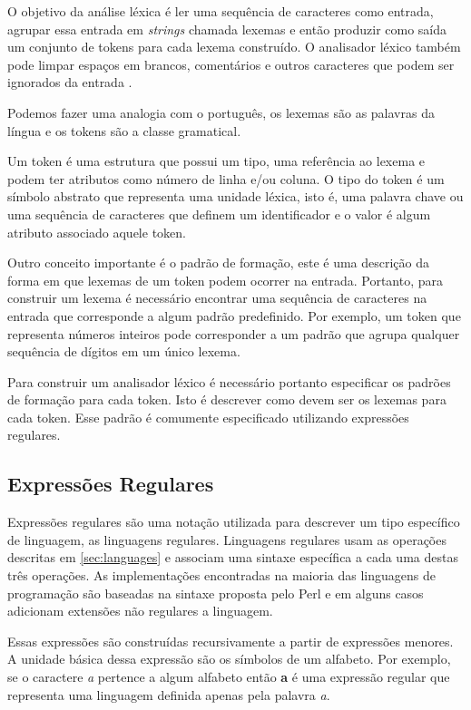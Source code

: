 O objetivo da análise léxica é ler uma sequência de caracteres como entrada, agrupar essa entrada em 
\textit{strings} chamada lexemas e então produzir como saída um conjunto de 
tokens para cada lexema construído. O analisador léxico também pode limpar espaços 
em brancos, comentários e outros caracteres que podem ser ignorados da entrada \cite{aho2006}.

Podemos fazer uma analogia com o português, os lexemas são as palavras da língua e os tokens são
a classe gramatical.

Um token é uma estrutura que possui um tipo, uma referência ao lexema e podem ter atributos como número de linha 
e/ou coluna.
O tipo do token é um símbolo abstrato que representa uma unidade léxica, isto é, uma  palavra chave ou
uma sequência de caracteres que definem um identificador e o valor é algum atributo associado aquele token.

Outro conceito importante é o padrão de formação, este é uma descrição da forma em que lexemas de
um token podem ocorrer na entrada. Portanto, para construir um lexema é necessário 
encontrar uma sequência de caracteres na entrada que corresponde a algum padrão predefinido.
Por exemplo, um token que representa números inteiros pode corresponder a um padrão que agrupa
qualquer sequência de dígitos em um único lexema.

Para construir um analisador léxico é necessário portanto especificar os padrões de formação para cada token. 
Isto é descrever como devem ser os lexemas para cada token. Esse padrão é comumente especificado 
utilizando expressões regulares.

\subsection{Expressões Regulares}

Expressões regulares são uma notação utilizada para descrever um tipo específico de linguagem, as linguagens regulares.
Linguagens regulares usam as operações descritas em \ref{sec:languages} e associam uma sintaxe
específica a cada uma destas três operações. As implementações encontradas na maioria das linguagens de programação
são baseadas na sintaxe proposta pelo Perl e em alguns casos adicionam extensões não regulares a 
linguagem.

Essas expressões são construídas recursivamente a partir de expressões menores. 
A unidade básica dessa expressão são os símbolos de um alfabeto. Por exemplo,
se o caractere \textit{a} pertence a algum alfabeto então \textbf{a} é 
uma expressão regular que representa uma linguagem definida apenas pela palavra \textit{a}.

